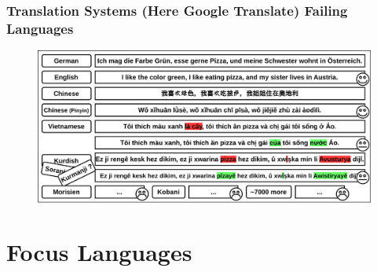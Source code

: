 \documentclass[aspectratio=169]{beamer}
\begin{document}
\begin{frame}[fragile]
	\frametitle{Translation Systems (Here Google Translate) Failing Languages}
    \begin{figure}
	    \centering
	    \includegraphics[width=1.0\textwidth]{images/CRAMT-Tool-MotivationSimpleMore.png}
	\end{figure}
\end{frame}

\section{Focus Languages}
\end{document}
